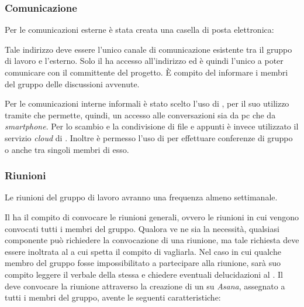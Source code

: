 \documentclass[12pt,a4paper]{article}
\begin{document}
\newpage
\subsubsection{Comunicazione}
Per le comunicazioni esterne è stata creata una casella di posta elettronica:
\begin{center}
\href{mailto:\mailGruppo{}}{\mailGruppo{}}
\end{center}
Tale indirizzo deve essere l'unico canale di comunicazione esistente tra il gruppo di lavoro e l'esterno. Solo il \PM{} ha accesso all'indirizzo ed è quindi l'unico a poter comunicare con il committente del progetto. È compito del \PM{} informare i membri del gruppo delle discussioni avvenute.

Per le comunicazioni interne informali è stato scelto l'uso di , per il suo utilizzo tramite \textit{} che permette, quindi, un accesso alle conversazioni sia da pc che da \textit{smartphone}. Per lo scambio e la condivisione di file e appunti è invece utilizzato il servizio \textit{cloud} di . Inoltre è permesso l'uso di  per effettuare conferenze di gruppo o anche tra singoli membri di esso.

\subsubsection{Riunioni}
Le riunioni del gruppo di lavoro avranno una frequenza almeno settimanale.

Il \PM{} ha il compito di convocare le riunioni generali, ovvero le riunioni in cui vengono convocati tutti i membri del gruppo.
Qualora ve ne sia la necessità, qualsiasi componente può richiedere la convocazione di una riunione, ma tale richiesta deve essere inoltrata al \PM{} a cui spetta il compito di vagliarla.
Nel caso in cui qualche membro del gruppo fosse impossibilitato a partecipare  alla riunione, sarà suo compito leggere il verbale della stessa e chiedere eventuali delucidazioni al \PM{}.
Il \PM{} deve convocare la riunione attraverso la creazione di un \textit{} su \textit{Asana}, assegnato a tutti i membri del gruppo, avente le seguenti caratteristiche:
\end{document}
